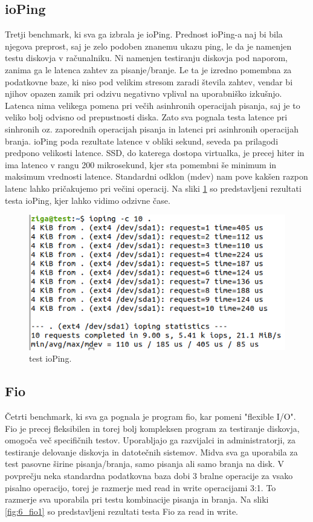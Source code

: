 \subsection{ioPing}
Tretji benchmark, ki sva ga izbrala je ioPing. Prednost ioPing-a naj bi bila njegova preprost, saj je zelo podoben znanemu ukazu ping, le da je namenjen testu diskovja v računalniku. Ni namenjen testiranju diskovja pod naporom, zanima ga le latenca zahtev za pisanje/branje. Le ta je izredno pomembna za podatkovne baze, ki niso pod velikim stresom zaradi števila zahtev, vendar bi njihov opazen zamik pri odzivu negativno vplival na uporabniško izkušnjo. Latenca nima velikega pomena pri večih asinhronih operacijah pisanja, saj je to veliko bolj odvisno od prepustnosti diska. Zato sva pognala testa latence pri sinhronih oz. zaporednih operacijah pisanja in latenci pri asinhronih operacijah branja. ioPing poda rezultate latence v obliki sekund, seveda pa prilagodi predpono velikosti latence. SSD, do katerega dostopa virtualka, je precej hiter in ima latenco v rangu 200 mikrosekund, kjer sta pomembni še minimum in maksimum vrednosti latence. Standardni odklon (mdev) nam pove kakšen razpon latenc lahko pričakujemo pri večini operacij. Na sliki \ref{fig:5_ioping1} so predstavljeni rezultati testa ioPing, kjer lahko vidimo odzivne čase.
\begin{figure}[H]
    \centering
    \includegraphics[scale=0.5]{Img/ioping1.png}
    \caption{test ioPing.}
    \label{fig:5_ioping1}
\end{figure}

\subsection{Fio}
Četrti benchmark, ki sva ga pognala je program fio, kar pomeni "flexible I/O". Fio je precej fleksibilen in torej bolj kompleksen program za testiranje diskovja, omogoča več specifičnih testov. Uporabljajo ga razvijalci in administratorji, za testiranje delovanje diskovja in datotečnih sistemov. Midva sva ga uporabila za test pasovne širine pisanja/branja, samo pisanja ali samo branja na disk. V povprečju neka standardna podatkovna baza dobi 3 bralne operacije za vsako pisalno operacijo, torej je razmerje med read in write operacijami 3:1. To razmerje sva uporabila pri testu kombinacije pisanja in branja. Na sliki \ref{fig:6_fio1} so predstavljeni rezultati testa Fio za read in write.

